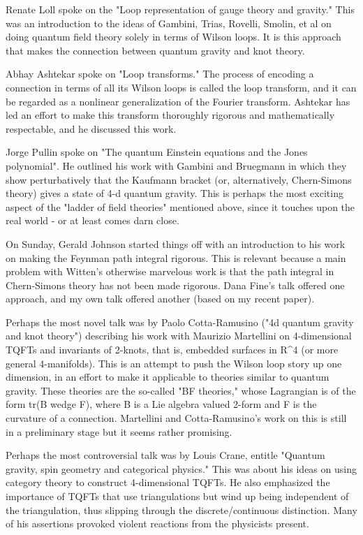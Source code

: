 Renate Loll spoke on the "Loop representation of gauge theory and
gravity."  This was an introduction to the ideas of Gambini, Trias,
Rovelli, Smolin, et al on doing quantum field theory solely in terms of
Wilson loops.  It is this approach that makes the connection between
quantum gravity and knot theory.  

Abhay Ashtekar spoke on "Loop transforms."  The process of encoding a
connection in terms of all its Wilson loops is called the loop
transform, and it can be regarded as a nonlinear generalization of the
Fourier transform.  Ashtekar has led an effort to make this transform
thoroughly rigorous and mathematically respectable, and he discussed
this work.

Jorge Pullin spoke on "The quantum Einstein equations and the Jones
polynomial".  He outlined his work with Gambini and Bruegmann in which
they show perturbatively that the Kaufmann bracket (or, alternatively,
Chern-Simons theory) gives a state of 4-d quantum gravity.  This is
perhaps the most exciting aspect of the "ladder of field theories"
mentioned above, since it touches upon the real world - or at least
comes darn close.  

On Sunday, Gerald Johnson started things off with an introduction to his
work on making the Feynman path integral rigorous.  This is relevant
because a main problem with Witten's otherwise marvelous work is that
the path integral in Chern-Simons theory has not been made rigorous.
Dana Fine's talk offered one approach, and my own talk offered another
(based on my recent paper).  

Perhaps the most novel talk was by Paolo Cotta-Ramusino ("4d quantum
gravity and knot theory") describing his work with Maurizio Martellini
on 4-dimensional TQFTs and invariants of 2-knots, that is, embedded
surfaces in R^4 (or more general 4-manifolds).  This is an attempt to
push the Wilson loop story up one dimension, in an effort to make it
applicable to theories similar to quantum gravity.  These theories are
the so-called "BF theories," whose Lagrangian is of the form tr(B wedge
F), where B is a Lie algebra valued 2-form and F is the curvature of a
connection.  Martellini and Cotta-Ramusino's work on this is still in a
preliminary stage but it seems rather promising.

Perhaps the most controversial talk was by Louis Crane, entitle "Quantum
gravity, spin geometry and categorical physics."  This was about his
ideas on using category theory to construct 4-dimensional TQFTs.  He
also emphasized the importance of TQFTs that use triangulations but wind
up being independent of the triangulation, thus slipping through the
discrete/continuous distinction.   Many of his assertions provoked
violent reactions from the physicists present.  

